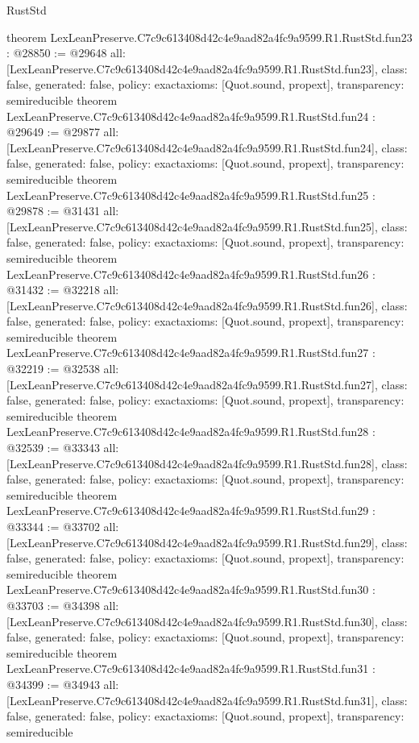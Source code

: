 \begin{lexlean}{RustStd}
\begin{coremodule}
{}
theorem LexLeanPreserve.C7c9c613408d42c4e9aad82a4fc9a9599.R1.RustStd.fun23 : @28850 := @29648 {
  all: [LexLeanPreserve.C7c9c613408d42c4e9aad82a4fc9a9599.R1.RustStd.fun23],
  class: false,
  generated: false,
  policy: exact{axioms: [Quot.sound, propext]},
  transparency: semireducible
}
theorem LexLeanPreserve.C7c9c613408d42c4e9aad82a4fc9a9599.R1.RustStd.fun24 : @29649 := @29877 {
  all: [LexLeanPreserve.C7c9c613408d42c4e9aad82a4fc9a9599.R1.RustStd.fun24],
  class: false,
  generated: false,
  policy: exact{axioms: [Quot.sound, propext]},
  transparency: semireducible
}
theorem LexLeanPreserve.C7c9c613408d42c4e9aad82a4fc9a9599.R1.RustStd.fun25 : @29878 := @31431 {
  all: [LexLeanPreserve.C7c9c613408d42c4e9aad82a4fc9a9599.R1.RustStd.fun25],
  class: false,
  generated: false,
  policy: exact{axioms: [Quot.sound, propext]},
  transparency: semireducible
}
theorem LexLeanPreserve.C7c9c613408d42c4e9aad82a4fc9a9599.R1.RustStd.fun26 : @31432 := @32218 {
  all: [LexLeanPreserve.C7c9c613408d42c4e9aad82a4fc9a9599.R1.RustStd.fun26],
  class: false,
  generated: false,
  policy: exact{axioms: [Quot.sound, propext]},
  transparency: semireducible
}
theorem LexLeanPreserve.C7c9c613408d42c4e9aad82a4fc9a9599.R1.RustStd.fun27 : @32219 := @32538 {
  all: [LexLeanPreserve.C7c9c613408d42c4e9aad82a4fc9a9599.R1.RustStd.fun27],
  class: false,
  generated: false,
  policy: exact{axioms: [Quot.sound, propext]},
  transparency: semireducible
}
theorem LexLeanPreserve.C7c9c613408d42c4e9aad82a4fc9a9599.R1.RustStd.fun28 : @32539 := @33343 {
  all: [LexLeanPreserve.C7c9c613408d42c4e9aad82a4fc9a9599.R1.RustStd.fun28],
  class: false,
  generated: false,
  policy: exact{axioms: [Quot.sound, propext]},
  transparency: semireducible
}
theorem LexLeanPreserve.C7c9c613408d42c4e9aad82a4fc9a9599.R1.RustStd.fun29 : @33344 := @33702 {
  all: [LexLeanPreserve.C7c9c613408d42c4e9aad82a4fc9a9599.R1.RustStd.fun29],
  class: false,
  generated: false,
  policy: exact{axioms: [Quot.sound, propext]},
  transparency: semireducible
}
theorem LexLeanPreserve.C7c9c613408d42c4e9aad82a4fc9a9599.R1.RustStd.fun30 : @33703 := @34398 {
  all: [LexLeanPreserve.C7c9c613408d42c4e9aad82a4fc9a9599.R1.RustStd.fun30],
  class: false,
  generated: false,
  policy: exact{axioms: [Quot.sound, propext]},
  transparency: semireducible
}
theorem LexLeanPreserve.C7c9c613408d42c4e9aad82a4fc9a9599.R1.RustStd.fun31 : @34399 := @34943 {
  all: [LexLeanPreserve.C7c9c613408d42c4e9aad82a4fc9a9599.R1.RustStd.fun31],
  class: false,
  generated: false,
  policy: exact{axioms: [Quot.sound, propext]},
  transparency: semireducible
}
\end{coremodule}
\end{lexlean}
